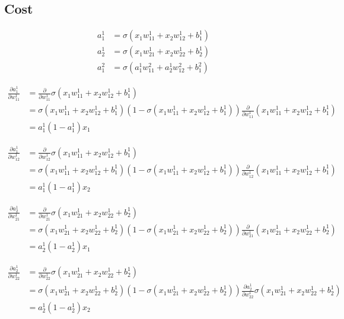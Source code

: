\documentclass{article}
\begin{document}
\subsection{Cost}

\begin{align*}
a^1_1 &= \sigma(x_1 w^1_{11} + x_2 w^1_{12} + b^1_1)\\
a^1_2 &= \sigma(x_1 w^1_{21} + x_2 w^1_{22} + b^1_2)\\
a^2_1 &= \sigma(a^1_1 w^2_{11} + a^1_2 w^2_{12} + b^2_1)
\end{align*}

\begin{align*}
\frac{\partial a^1_1}{\partial w^1_{11}} &= \frac{\partial}{\partial w^1_{11}} \sigma(x_1 w^1_{11} + x_2 w^1_{12} + b^1_1)\\
&= \sigma(x_1 w^1_{11} + x_2 w^1_{12} + b^1_1)(1 - \sigma(x_1 w^1_{11} + x_2 w^1_{12} + b^1_1)) \frac{\partial}{\partial w^1_{11}} (x_1 w^1_{11} + x_2 w^1_{12} + b^1_1)\\
&= a^1_1(1 - a^1_1)x_1
\end{align*}

\begin{align*}
\frac{\partial a^1_1}{\partial w^1_{12}} &= \frac{\partial}{\partial w^1_{12}} \sigma(x_1 w^1_{11} + x_2 w^1_{12} + b^1_1)\\
&= \sigma(x_1 w^1_{11} + x_2 w^1_{12} + b^1_1)(1 - \sigma(x_1 w^1_{11} + x_2 w^1_{12} + b^1_1)) \frac{\partial}{\partial w^1_{12}} (x_1 w^1_{11} + x_2 w^1_{12} + b^1_1)\\
&= a^1_1(1 - a^1_1)x_2
\end{align*}

\begin{align*}
\frac{\partial a^1_2}{\partial w^1_{21}} &= \frac{\partial}{\partial w^1_{21}} \sigma(x_1 w^1_{21} + x_2 w^1_{22} + b^1_2)\\
&= \sigma(x_1 w^1_{21} + x_2 w^1_{22} + b^1_2)(1 - \sigma(x_1 w^1_{21} + x_2 w^1_{22} + b^1_2)) \frac{\partial}{\partial w^1_{21}} (x_1 w^1_{21} + x_2 w^1_{22} + b^1_2)\\
&= a^1_2(1 - a^1_2)x_1
\end{align*}

\begin{align*}
\frac{\partial a^1_2}{\partial w^1_{22}} &= \frac{\partial}{\partial w^1_{22}} \sigma(x_1 w^1_{21} + x_2 w^1_{22} + b^1_2)\\
&= \sigma(x_1 w^1_{21} + x_2 w^1_{22} + b^1_2)(1 - \sigma(x_1 w^1_{21} + x_2 w^1_{22} + b^1_2)) \frac{\partial a^1_2}{\partial w^1_{22}} \sigma(x_1 w^1_{21} + x_2 w^1_{22} + b^1_2)\\
&= a^1_2(1 - a^1_2)x_2
\end{align*}
\end{document}
